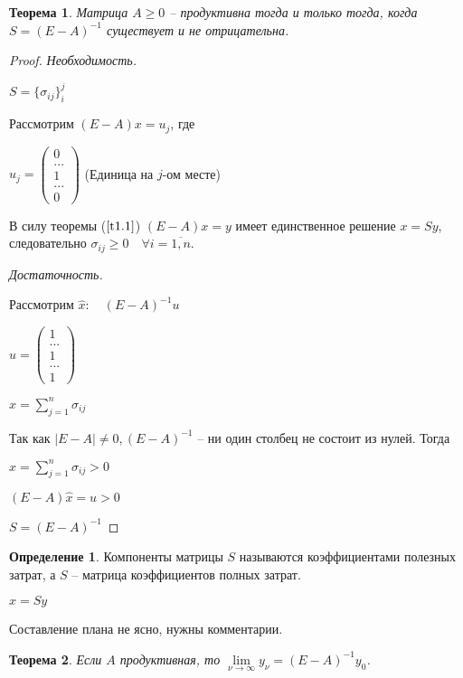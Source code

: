 \documentclass[12pt,a4paper,titlepage,oneside]{book}
\theoremstyle{definition}
\newtheorem{definition}{Определение}[chapter]
\theoremstyle{plain}
\newtheorem{theorem}{Теорема}[chapter]
\theoremstyle{remark}
\theoremstyle{remark}
\theoremstyle{plain}
\theoremstyle{plain}
\begin{document}
\begin{theorem}\label{t1.2}
Матрица $A \geq 0$ -- продуктивна тогда и только тогда, когда $S = (E-A)^{-1}$ существует и не отрицательна.
\end{theorem}

\begin{proof}

\textit{Необходимость.}

$S = \{ \sigma_{ij} \}_{i}^{j}$

Рассмотрим $(E-A)x = u_j$, где

$u_j = \left(\begin{array}{crl}
0\\ ... \\1\\...\\ 0
\end{array}\right)$ (Единица на $j$-ом месте)

В силу теоремы ($\ref{t1.1}$) $(E-A)x=y$ имеет единственное решение $x=Sy$, следовательно $\sigma_{ij} \geq 0 \quad \forall i = \overline{1,n}$.

\textit{Достаточность.}

Рассмотрим $\hat{x}: \quad (E-A)^{-1}u$

$u = \left(\begin{array}{crl}
1\\ ... \\1\\...\\ 1
\end{array}\right)$

$\hat{x} = \sum\limits_{j=1}^{n} \sigma_{ij}$

Так как $|E-A| \neq 0, (E-A)^{-1}$ -- ни один столбец не состоит из нулей. Тогда 

$\hat{x} = \sum\limits_{j=1}^{n} \sigma_{ij} > 0$

$(E-A)\hat{x}=u>0$

$S=(E-A)^{-1}$
\end{proof}

\begin{definition}
Компоненты матрицы $S$ называются коэффициентами полезных затрат, а $S$ -- матрица коэффициентов полных затрат.

$x = Sy$

\end{definition}


Составление плана не ясно, нужны комментарии.

\begin{theorem}
Если $A$ продуктивная, то $\lim\limits_{\nu \to \infty} y_{\nu} = (E-A)^{-1}y_0$.
\end{theorem}
\end{document}

